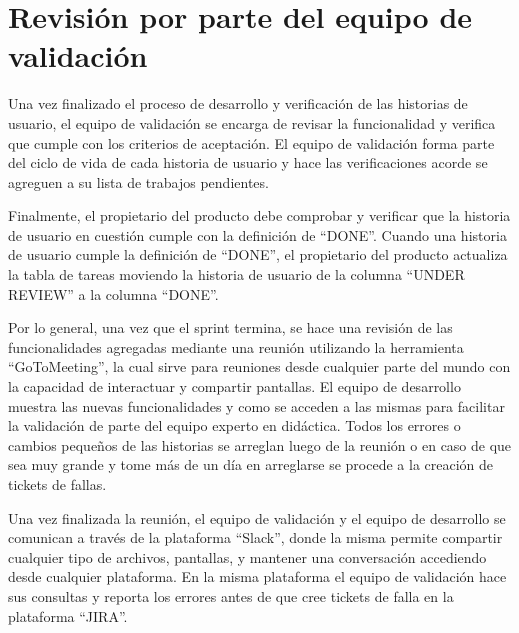 \section{Revisión por parte del equipo de validación}
Una vez finalizado el proceso de desarrollo y verificación de las historias de usuario, el equipo de validación se encarga de revisar la funcionalidad y verifica que cumple con los criterios de aceptación. El equipo de validación forma parte del ciclo de vida de cada historia de usuario y hace las verificaciones acorde se agreguen a su lista de trabajos pendientes.

Finalmente, el propietario del producto debe comprobar y verificar que la historia de usuario en cuestión cumple con la definición de \enquote{DONE}. Cuando una historia de usuario cumple la definición de \enquote{DONE}, el propietario del producto actualiza la tabla de tareas moviendo la historia de usuario de la columna \enquote{UNDER REVIEW} a la columna \enquote{DONE}.

Por lo general, una vez que el sprint termina, se hace una revisión de las funcionalidades agregadas mediante una reunión utilizando la herramienta \enquote{GoToMeeting}, la cual sirve para reuniones desde cualquier parte del mundo con la capacidad de interactuar y compartir pantallas. El equipo de desarrollo muestra las nuevas funcionalidades y como se acceden a las mismas para facilitar la validación de parte del equipo experto en didáctica. Todos los errores o cambios pequeños de las historias se arreglan luego de la reunión o en caso de que sea muy grande y tome más de un día en arreglarse se procede a la creación de tickets de fallas.

Una vez finalizada la reunión, el equipo de validación y el equipo de desarrollo se comunican a través de la plataforma \enquote{Slack}, donde la misma permite compartir cualquier tipo de archivos, pantallas, y mantener una conversación accediendo desde cualquier plataforma. En la misma plataforma el equipo de validación hace sus consultas y reporta los errores antes de que cree tickets de falla en la plataforma \enquote{JIRA}.